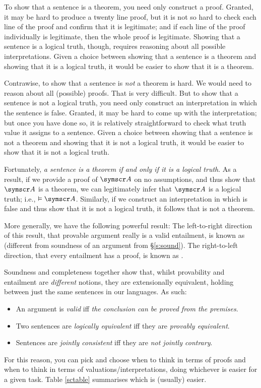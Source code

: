 To show that a sentence is a theorem, you need only construct a proof. Granted, it may be hard to produce a twenty line proof, but it is not so hard to check each line of the proof and confirm that it is legitimate; and if each line of the proof individually is legitimate, then the whole proof is legitimate. Showing that a sentence is a logical truth, though, requires reasoning about all possible interpretations. Given a choice between showing that a sentence is a theorem and showing that it is a logical truth, it would be easier to show that it is a theorem.

Contrawise, to show that a sentence is \emph{not} a theorem is hard. We would need to reason about all (possible) proofs. That is very difficult. But to show that a sentence is not a logical truth, you need only construct an interpretation in which the sentence is false. Granted, it may be hard to come up with the interpretation; but once you have done so, it is relatively straightforward to check what truth value it assigns to a sentence. Given a choice between showing that a sentence is not a theorem and showing that it is not a logical truth, it would be easier to show that it is not a logical truth.

Fortunately, \emph{a sentence is a theorem if and only if it is a logical truth}. As a result, if we provide a proof of $\meta{A}$ on no assumptions, and thus show that $\meta{A}$ is a theorem, we can legitimately infer that $\meta{A}$ is a logical truth; i.e., $\entails\meta{A}$. Similarly, if we construct an interpretation in which  is false and thus show that it is not a logical truth, it follows that  is not a theorem.

More generally, we have the following powerful result:
The left-to-right direction of this result, that provable argument really is a valid entailment, is known as  (different from soundness of an argument from §\ref{s:sound}). The right-to-left direction, that every entailment has a proof, is known as . 


Soundness and completeness together show that, whilst provability and entailment are \emph{different} notions, they are extensionally equivalent, holding between just the same sentences in our languages. As such:
	\begin{itemize}
		\item An argument is \emph{valid} iff \emph{the conclusion can be proved from the premises}.
		\item Two sentences are \emph{logically equivalent} iff they are \emph{provably equivalent}.
		\item Sentences are \emph{jointly consistent} iff they are \emph{not jointly contrary}.
	\end{itemize}
For this reason, you can pick and choose when to think in terms of proofs and when to think in terms of valuations/interpretations, doing whichever is easier for a given task. Table \ref{sctable} summarises which is (usually) easier.

